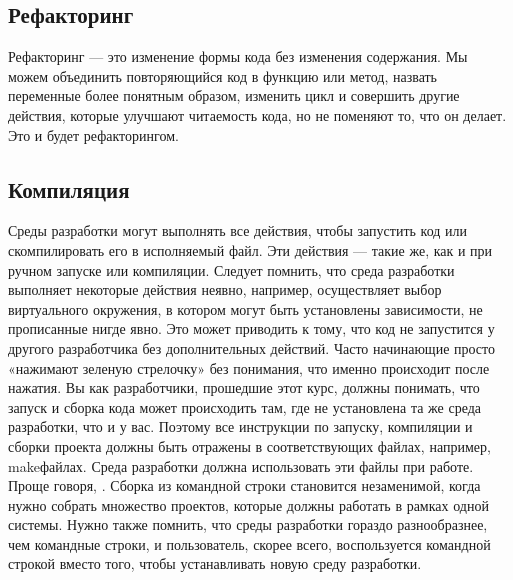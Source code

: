 \documentclass[letterpaper,10pt,russian]{sphinxmanual}
\begin{document}
\subsection{Рефакторинг}
\label{\detokenize{educational_materials/ide/content:id4}}
\sphinxAtStartPar
Рефакторинг — это изменение формы кода без изменения содержания. Мы можем объединить повторяющийся код в функцию или метод, назвать переменные более понятным образом, изменить цикл и совершить другие действия, которые улучшают читаемость кода, но не поменяют то, что он делает. Это и будет рефакторингом.

\sphinxAtStartPar
{}


\subsection{Компиляция}
\label{\detokenize{educational_materials/ide/content:id5}}
\sphinxAtStartPar
Среды разработки могут выполнять все действия, чтобы запустить код или скомпилировать его в исполняемый файл. Эти действия — такие же, как и при ручном запуске или компиляции. Следует помнить, что среда разработки выполняет некоторые действия неявно, например, осуществляет выбор виртуального окружения, в котором могут быть установлены зависимости, не прописанные нигде явно. Это может приводить к тому, что код не запустится у другого разработчика без дополнительных действий. Часто начинающие просто «нажимают зеленую стрелочку» без понимания, что именно происходит после нажатия. Вы как разработчики, прошедшие этот курс, должны понимать, что запуск и сборка кода может происходить там, где не установлена та же среда разработки, что и у вас. Поэтому все инструкции по запуску, компиляции и сборки проекта должны быть отражены в соответствующих файлах, например, make\sphinxhyphen{}файлах. Среда разработки должна использовать эти файлы при работе. Проще говоря, . Сборка из командной строки становится незаменимой, когда нужно собрать множество проектов, которые должны работать в рамках одной системы. Нужно также помнить, что среды разработки гораздо разнообразнее, чем командные строки, и пользователь, скорее всего, воспользуется командной строкой вместо того, чтобы устанавливать новую среду разработки.
\end{document}
